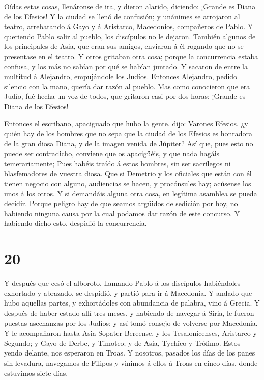  Oídas estas cosas, llenáronse de ira, y dieron alarido,
diciendo: ¡Grande es Diana de los Efesios!  Y la ciudad se
llenó de confusión; y unánimes se arrojaron al teatro, arrebatando á
Gayo y á Aristarco, Macedonios, compañeros de Pablo.  Y
queriendo Pablo salir al pueblo, los discípulos no le dejaron.
 También algunos de los principales de Asia, que eran sus
amigos, enviaron á él rogando que no se presentase en el teatro.
 Y otros gritaban otra cosa; porque la concurrencia estaba
confusa, y los más no sabían por qué se habían juntado.  Y
sacaron de entre la multitud á Alejandro, empujándole los Judíos.
Entonces Alejandro, pedido silencio con la mano, quería dar razón al
pueblo.  Mas como conocieron que era Judío, fué hecha un
voz de todos, que gritaron casi por dos horas: ¡Grande es Diana de los
Efesios!

 Entonces el escribano, apaciguado que hubo la gente, dijo:
Varones Efesios, ¿y quién hay de los hombres que no sepa que la ciudad
de los Efesios es honradora de la gran diosa Diana, y de la imagen
venida de Júpiter?  Así que, pues esto no puede ser
contradicho, conviene que os apacigüéis, y que nada hagáis
temerariamente;  Pues habéis traído á estos hombres, sin
ser sacrílegos ni blasfemadores de vuestra diosa.  Que si
Demetrio y los oficiales que están con él tienen negocio con alguno,
audiencias se hacen, y procónsules hay; acúsense los unos á los otros.
 Y si demandáis alguna otra cosa, en legítima asamblea se
pueda decidir.  Porque peligro hay de que seamos argüidos
de sedición por hoy, no habiendo ninguna causa por la cual podamos dar
razón de este concurso. Y habiendo dicho esto, despidió la concurrencia.

\hypertarget{section-19}{%
\section{20}\label{section-19}}

 Y después que cesó el alboroto, llamando Pablo á los
discípulos habiéndoles exhortado y abrazado, se despidió, y partió para
ir á Macedonia.  Y andado que hubo aquellas partes, y
exhortádoles con abundancia de palabra, vino á Grecia.  Y
después de haber estado allí tres meses, y habiendo de navegar á Siria,
le fueron puestas asechanzas por los Judíos; y así tomó consejo de
volverse por Macedonia.  Y le acompañaron hasta Asia Sopater
Bereense, y los Tesalonicenses, Aristarco y Segundo; y Gayo de Derbe, y
Timoteo; y de Asia, Tychîco y Trófimo.  Estos yendo delante,
nos esperaron en Troas.  Y nosotros, pasados los días de los
panes sin levadura, navegamos de Filipos y vinimos á ellos á Troas en
cinco días, donde estuvimos siete días.

